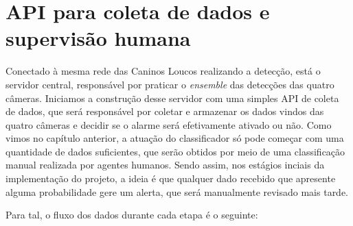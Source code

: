 \documentclass[]{politex}
\begin{document}
\section{API para coleta de dados e supervisão humana}

Conectado à mesma rede das Caninos Loucos realizando a detecção, está o servidor central, responsável por praticar o \textit{ensemble} das detecções das quatro câmeras. Iniciamos a construção desse servidor com uma simples API de coleta de dados, que será responsável por coletar e armazenar os dados vindos das quatro câmeras e decidir se o alarme será efetivamente ativado ou não. Como vimos no capítulo anterior, a atuação do classificador só pode começar com uma quantidade de dados suficientes, que serão obtidos por meio de uma classificação manual realizada por agentes humanos. Sendo assim, nos estágios inciais da implementação do projeto, a ideia é que qualquer dado recebido que apresente alguma probabilidade gere um alerta, que será manualmente revisado mais tarde.

Para tal, o fluxo dos dados durante cada etapa é o seguinte:
\end{document}
